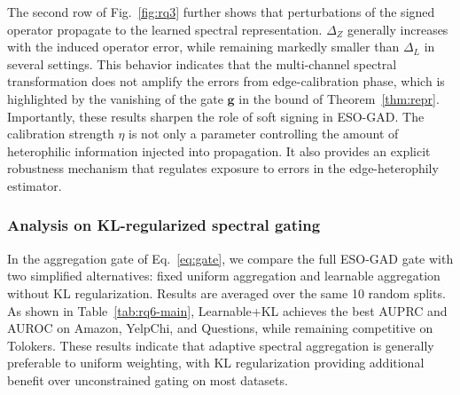 The second row of Fig.~\ref{fig:rq3} further shows that perturbations of the signed operator propagate to the learned spectral representation.
$\Delta_Z$ generally increases with the induced operator error, while remaining markedly smaller than $\Delta_L$ in several settings. 
This behavior indicates that the multi-channel spectral transformation does not amplify the errors from edge-calibration phase, which is highlighted by the vanishing of the gate $\bm g$ in the bound of Theorem~\ref{thm:repr}.
Importantly, these results sharpen the role of soft signing in ESO-GAD. 
The calibration strength $\eta$ is not only a parameter controlling the amount of heterophilic information injected into propagation.
It also provides an explicit robustness mechanism that regulates exposure to errors in the edge-heterophily estimator.

\subsubsection{Analysis on KL-regularized spectral gating}
\label{sec:rq6}
In the aggregation gate of Eq.~\eqref{eq:gate}, 
we compare the full ESO-GAD gate with two simplified alternatives: fixed uniform aggregation and learnable aggregation without KL regularization. 
Results are averaged over the same 10 random splits.
As shown in Table~\ref{tab:rq6-main}, Learnable+KL achieves the best AUPRC and AUROC on Amazon, YelpChi, and Questions, while remaining competitive on Tolokers. 
These results indicate that adaptive spectral aggregation is generally preferable to uniform weighting, with KL regularization providing additional benefit over unconstrained gating on most datasets.

